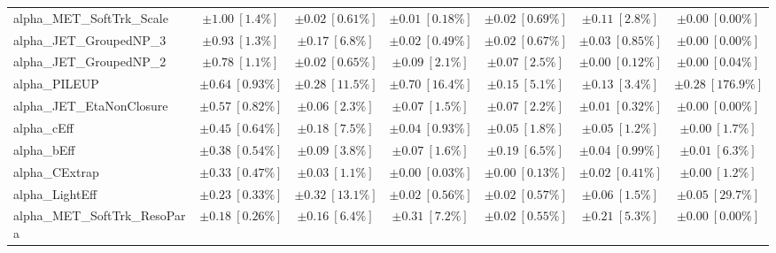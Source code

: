 \begin{sidewaystable}
\begin{center}
\begin{tabular*}{\textwidth}{@{\extracolsep{\fill}}lcccccc}
alpha\_MET\_SoftTrk\_Scale         & $\pm 1.00\ [1.4\%] $          & $\pm 0.02\ [0.61\%] $          & $\pm 0.01\ [0.18\%] $          & $\pm 0.02\ [0.69\%] $          & $\pm 0.11\ [2.8\%] $          & $\pm 0.00\ [0.00\%] $       \\
alpha\_JET\_GroupedNP\_3         & $\pm 0.93\ [1.3\%] $          & $\pm 0.17\ [6.8\%] $          & $\pm 0.02\ [0.49\%] $          & $\pm 0.02\ [0.67\%] $          & $\pm 0.03\ [0.85\%] $          & $\pm 0.00\ [0.00\%] $       \\
alpha\_JET\_GroupedNP\_2         & $\pm 0.78\ [1.1\%] $          & $\pm 0.02\ [0.65\%] $          & $\pm 0.09\ [2.1\%] $          & $\pm 0.07\ [2.5\%] $          & $\pm 0.00\ [0.12\%] $          & $\pm 0.00\ [0.04\%] $       \\
alpha\_PILEUP         & $\pm 0.64\ [0.93\%] $          & $\pm 0.28\ [11.5\%] $          & $\pm 0.70\ [16.4\%] $          & $\pm 0.15\ [5.1\%] $          & $\pm 0.13\ [3.4\%] $          & $\pm 0.28\ [176.9\%] $       \\
alpha\_JET\_EtaNonClosure         & $\pm 0.57\ [0.82\%] $          & $\pm 0.06\ [2.3\%] $          & $\pm 0.07\ [1.5\%] $          & $\pm 0.07\ [2.2\%] $          & $\pm 0.01\ [0.32\%] $          & $\pm 0.00\ [0.00\%] $       \\
alpha\_cEff         & $\pm 0.45\ [0.64\%] $          & $\pm 0.18\ [7.5\%] $          & $\pm 0.04\ [0.93\%] $          & $\pm 0.05\ [1.8\%] $          & $\pm 0.05\ [1.2\%] $          & $\pm 0.00\ [1.7\%] $       \\
alpha\_bEff         & $\pm 0.38\ [0.54\%] $          & $\pm 0.09\ [3.8\%] $          & $\pm 0.07\ [1.6\%] $          & $\pm 0.19\ [6.5\%] $          & $\pm 0.04\ [0.99\%] $          & $\pm 0.01\ [6.3\%] $       \\
alpha\_CExtrap         & $\pm 0.33\ [0.47\%] $          & $\pm 0.03\ [1.1\%] $          & $\pm 0.00\ [0.03\%] $          & $\pm 0.00\ [0.13\%] $          & $\pm 0.02\ [0.41\%] $          & $\pm 0.00\ [1.2\%] $       \\
alpha\_LightEff         & $\pm 0.23\ [0.33\%] $          & $\pm 0.32\ [13.1\%] $          & $\pm 0.02\ [0.56\%] $          & $\pm 0.02\ [0.57\%] $          & $\pm 0.06\ [1.5\%] $          & $\pm 0.05\ [29.7\%] $       \\
alpha\_MET\_SoftTrk\_ResoPara         & $\pm 0.18\ [0.26\%] $          & $\pm 0.16\ [6.4\%] $          & $\pm 0.31\ [7.2\%] $          & $\pm 0.02\ [0.55\%] $          & $\pm 0.21\ [5.3\%] $          & $\pm 0.00\ [0.00\%] $       \\

\end{tabular*}
\end{center}
\end{sidewaystable}

